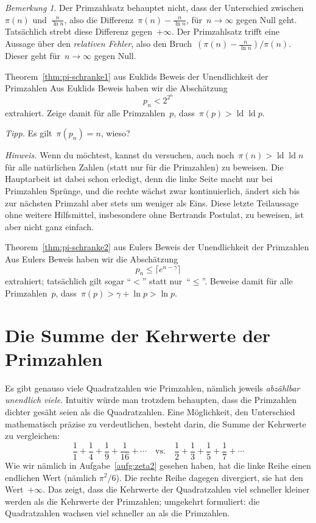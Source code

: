\documentclass[twoside]{../zirkelblatt1415}
\theoremstyle{definition}
\theoremstyle{plain}
\theoremstyle{remark}
\newtheorem{bem}[defn]{Bemerkung}
\DeclareMathOperator{\ld}{ld}
\begin{document}
\begin{bem}Der Primzahlsatz behauptet nicht, dass der Unterschied
zwischen~$\pi(n)$ und~$\frac{n}{\ln n}$, also die Differenz~$\pi(n) - \frac{n}{\ln n}$, für~$n
\to \infty$ gegen Null geht. Tatsächlich strebt diese Differenz
gegen~$+\infty$. Der Primzahlsatz trifft eine Aussage über den \emph{relativen
Fehler}, also den Bruch~$(\pi(n)-\frac{n}{\ln n})/\pi(n)$. Dieser geht für~$n \to
\infty$ gegen Null.
\end{bem}


\begin{aufgabe}{Theorem~\ref{thm:pi-schranke1} aus Euklids Beweis der
Unendlichkeit der Primzahlen}
Aus Euklids Beweis haben wir die Abschätzung
\[ p_n < 2^{2^n} \]
extrahiert. Zeige damit für alle Primzahlen~$p$, dass~$\pi(p) > \ld \ld p$.

\emph{Tipp.} Es gilt~$\pi(p_n) = n$, wieso?

\emph{Hinweis.} Wenn du möchtest, kannst du versuchen, auch noch~$\pi(n) > \ld
\ld n$ für alle natürlichen Zahlen (statt nur für die Primzahlen) zu beweisen.
Die Hauptarbeit ist dabei schon erledigt, denn die linke Seite macht nur bei
Primzahlen Sprünge, und die rechte wächst zwar kontinuierlich, ändert sich bis
zur nächsten Primzahl aber stets um weniger als Eins. Diese letzte Teilaussage
ohne weitere Hilfsmittel, insbesondere ohne Bertrands Postulat, zu beweisen,
ist aber nicht ganz einfach.
\end{aufgabe}

\begin{aufgabe}{Theorem~\ref{thm:pi-schranke2} aus Eulers Beweis der
Unendlichkeit der Primzahlen}
Aus Eulers Beweis haben wir die Abschätzung
\[ p_n \leq \lceil e^{n-\gamma} \rceil \]
extrahiert; tatsächlich gilt sogar "`$<$"' statt nur~"`$\leq$"'. Beweise damit
für alle Primzahlen~$p$, dass~$\pi(p) > \gamma + \ln p > \ln p$.
\end{aufgabe}



\section{Die Summe der Kehrwerte der Primzahlen}

Es gibt genauso viele Quadratzahlen wie Primzahlen, nämlich jeweils
\emph{abzählbar unendlich viele}. Intuitiv würde man trotzdem behaupten, dass
die Primzahlen dichter gesäht seien als die Quadratzahlen. Eine Möglichkeit,
den Unterschied mathematisch präzise zu verdeutlichen, besteht darin, die Summe
der Kehrwerte zu vergleichen:
\[ \frac{1}{1} + \frac{1}{4} + \frac{1}{9} + \frac{1}{16} + \cdots
  \quad\text{vs.}\quad
  \frac{1}{2} + \frac{1}{3} + \frac{1}{5} + \frac{1}{7} + \cdots \]
Wie wir nämlich in Aufgabe~\ref{aufg:zeta2} gesehen haben, hat die linke Reihe
einen endlichen Wert (nämlich $\pi^2/6$). Die rechte Reihe dagegen divergiert, sie hat
den Wert~$+\infty$. Das zeigt, dass die Kehrwerte der Quadratzahlen viel schneller
kleiner werden als die Kehrwerte der Primzahlen; umgekehrt formuliert: die
Quadratzahlen wachsen viel schneller an als die Primzahlen.
\end{document}
